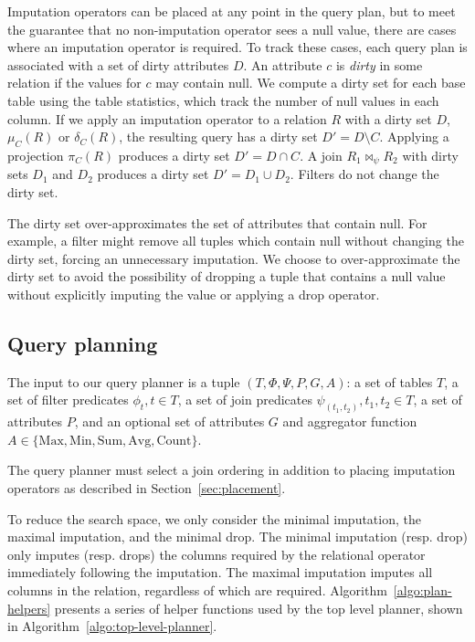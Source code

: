 Imputation operators can be placed at any point in the query plan, but to meet the guarantee that no non-imputation operator sees a null value, there are cases where an imputation operator is required. To track these cases, each query plan is associated with a set of dirty attributes $D$. An attribute $c$ is \emph{dirty} in some relation if the values for $c$ may contain null. We compute a dirty set for each base table using the table statistics, which track the number of null values in each column. If we apply an imputation operator to a relation $R$ with a dirty set $D$, $\mu_C (R)$ or $\delta_C (R)$, the resulting query has a dirty set $D' = D \setminus C$.  Applying a projection $\pi_C(R)$ produces a dirty set $D' = D \cap C$. A join $R_1 \Join_\psi R_2$ with dirty sets $D_1$ and $D_2$  produces a dirty set $D' = D_1 \cup D_2$.  Filters do not change the dirty set.

The dirty set over-approximates the set of attributes that contain null. For example, a filter might remove all tuples which contain null without changing the dirty set, forcing an unnecessary imputation. We choose to over-approximate the dirty set to avoid the possibility of dropping a tuple that contains a null value without explicitly imputing the value or applying a drop operator.

\subsection{Query planning}
The input to our query planner is a tuple $(T, \Phi, \Psi, P, G, A)$: a set of tables $T$, a set of filter predicates $\phi_t, t \in T$, a set of join predicates $\psi_(t_1, t_2), t_1, t_2 \in T$, a set of attributes $P$, and an optional set of attributes $G$ and aggregator function $A \in \{\text{Max}, \text{Min}, \text{Sum}, \text{Avg}, \text{Count}\}$.

The query planner must select a join ordering in addition to placing imputation operators as described in Section~\ref{sec:placement}.

To reduce the search space, we only consider the minimal imputation, the maximal imputation, and the minimal drop. The minimal imputation (resp. drop) only imputes (resp. drops) the columns required by the relational operator immediately following the imputation. The maximal imputation imputes all columns in the relation, regardless of which are required.  Algorithm~\ref{algo:plan-helpers} presents
a series of helper functions used by the top level planner, shown in Algorithm~\ref{algo:top-level-planner}.

